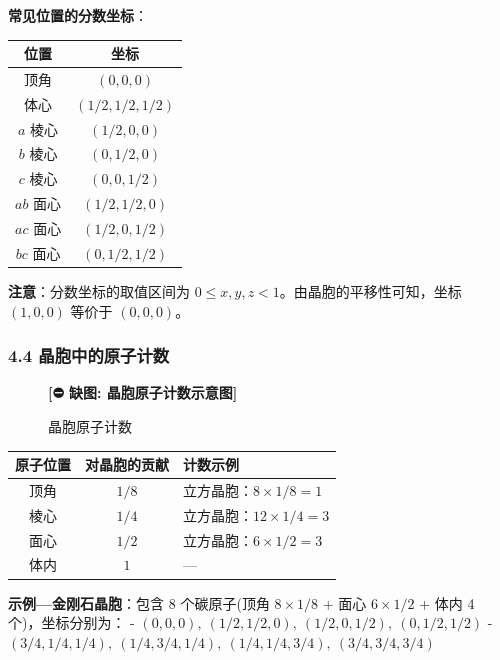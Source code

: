 \documentclass[a4paper,11pt]{ctexart}
\newcounter{none}
\newcommand{\箭}{\ensuremath{\rightarrow}}
\newcommand{\左箭}{\ensuremath{\leftarrow}}
\newcommand{\上箭}{\ensuremath{\uparrow}}
\newcommand{\下箭}{\ensuremath{\downarrow}}
\newcommand{\衡}{\ensuremath{\rightleftharpoons}}
\newcommand{\双箭}{\ensuremath{\leftrightarrow}}
\newcommand{\约等于}{\ensuremath{\approx}}
\newcommand{\小于等于}{\ensuremath{\leq}}
\newcommand{\大于等于}{\ensuremath{\geq}}
\newcommand{\不等于}{\ensuremath{\neq}}
\newcommand{\西格马}{\ensuremath{\sigma}}
\newcommand{\派}{\ensuremath{\pi}}
\begin{document}
\textbf{常见位置的分数坐标}：

{\def\LTcaptype{none} %
\begin{longtable}[]{@{}cc@{}}
\toprule\noalign{}
位置 & 坐标 \\
\midrule\noalign{}
\endhead
\bottomrule\noalign{}
\endlastfoot
顶角 & \((0, 0, 0)\) \\
体心 & \((1/2, 1/2, 1/2)\) \\
\(a\) 棱心 & \((1/2, 0, 0)\) \\
\(b\) 棱心 & \((0, 1/2, 0)\) \\
\(c\) 棱心 & \((0, 0, 1/2)\) \\
\(ab\) 面心 & \((1/2, 1/2, 0)\) \\
\(ac\) 面心 & \((1/2, 0, 1/2)\) \\
\(bc\) 面心 & \((0, 1/2, 1/2)\) \\
\end{longtable}
}

\textbf{注意}：分数坐标的取值区间为 \(0 \leqslant x, y, z < 1\)。由晶胞的平移性可知，坐标 \((1, 0, 0)\) 等价于 \((0, 0, 0)\)。

\subsubsection{4.4 晶胞中的原子计数}\label{ux6676ux80deux4e2dux7684ux539fux5b50ux8ba1ux6570}

\begin{figure}[H]\centering
\textbf{[⛔ 缺图: 晶胞原子计数示意图]}
\caption{晶胞原子计数}
\end{figure}

{\def\LTcaptype{none} %
\begin{longtable}[]{@{}ccl@{}}
\toprule\noalign{}
原子位置 & 对晶胞的贡献 & 计数示例 \\
\midrule\noalign{}
\endhead
\bottomrule\noalign{}
\endlastfoot
顶角 & \(1/8\) & 立方晶胞：\(8 \times 1/8 = 1\) \\
棱心 & \(1/4\) & 立方晶胞：\(12 \times 1/4 = 3\) \\
面心 & \(1/2\) & 立方晶胞：\(6 \times 1/2 = 3\) \\
体内 & \(1\) & --- \\
\end{longtable}
}

\textbf{示例---金刚石晶胞}：包含 8 个碳原子(顶角 \(8 \times 1/8\) + 面心 \(6 \times 1/2\) + 体内 4 个)，坐标分别为：
- \((0, 0, 0),\ (1/2, 1/2, 0),\ (1/2, 0, 1/2),\ (0, 1/2, 1/2)\)
- \((3/4, 1/4, 1/4),\ (1/4, 3/4, 1/4),\ (1/4, 1/4, 3/4),\ (3/4, 3/4, 3/4)\)
\end{document}
